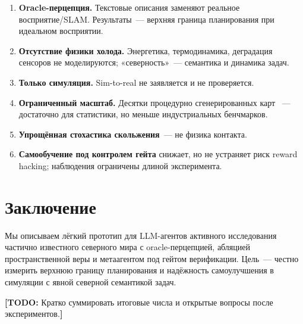 \documentclass[11pt,a4paper]{article}
\newcommand{\todo}[1]{\textcolor{red!70!black}{\textbf{[TODO:} #1\textbf{]}}}
\begin{document}
\begin{enumerate}[leftmargin=*]
  \item \textbf{Oracle-перцепция.} Текстовые описания заменяют реальное
        восприятие/SLAM. Результаты~--- верхняя граница планирования при
        идеальном восприятии.
  \item \textbf{Отсутствие физики холода.} Энергетика, термодинамика,
        деградация сенсоров не моделируются; «северность»~--- семантика
        и динамика задач.
  \item \textbf{Только симуляция.} Sim-to-real не заявляется и не проверяется.
  \item \textbf{Ограниченный масштаб.} Десятки процедурно сгенерированных карт~
        --- достаточно для статистики, но меньше индустриальных бенчмарков.
  \item \textbf{Упрощённая стохастика скольжения}~--- не физика контакта.
  \item \textbf{Самообучение под контролем гейта} снижает, но не устраняет
        риск reward hacking; наблюдения ограничены длиной эксперимента.
\end{enumerate}

\section{Заключение}
\label{sec:conclusion}

Мы описываем лёгкий прототип для LLM-агентов активного исследования
частично известного северного мира с oracle-перцепцией, абляцией
пространственной веры и метаагентом под гейтом верификации.
Цель~--- честно измерить верхнюю границу планирования и надёжность
самоулучшения в симуляции с явной северной семантикой задач.

\todo{Кратко суммировать итоговые числа и открытые вопросы после экспериментов.}

\printbibliography
\end{document}
